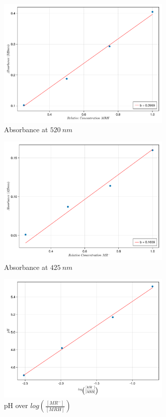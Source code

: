 \documentclass[a4paper, british]{article}
\begin{document}
\begin{figure}[h!]
    \centering
    \includegraphics[width=0.75\textwidth]{figures/MRH}
    \caption{Absorbance at \(520\ nm\)}
    \label{fig:MRH}
\end{figure}

\begin{figure}[h!]
    \centering
    \includegraphics[width=0.75\textwidth]{figures/MR.pdf}
    \caption{Absorbance at \(425\ nm\)}
    \label{fig:MR}
\end{figure}

\begin{figure}[H]
    \centering
    \includegraphics[width=0.75\textwidth]{figures/pH.pdf}
    \caption{pH over \(log \left( \frac{[MR^-]}{[MRH]} \right)\)}
    \label{fig:pH}
\end{figure}
\end{document}
